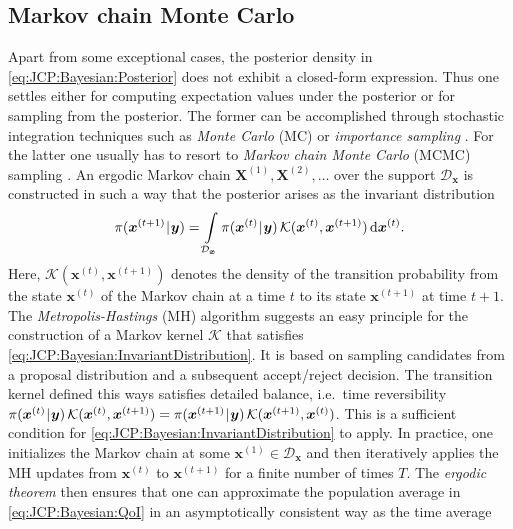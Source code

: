 \subsection{Markov chain Monte Carlo}
Apart from some exceptional cases, the posterior density in \cref{eq:JCP:Bayesian:Posterior} does not exhibit a closed-form expression.
Thus one settles either for computing expectation values under the posterior or for sampling from the posterior.
The former can be accomplished through stochastic integration techniques such as \emph{Monte Carlo} (MC) \cite{MCMC:Caflisch1998} or \emph{importance sampling} \cite{MCMC:Tokdar2010}.
For the latter one usually has to resort to \emph{Markov chain Monte Carlo} (MCMC) sampling \cite{MCMC:Gilks1996,MCMC:Brooks2011}.
An ergodic Markov chain \(\bm{X}^{(1)},\bm{X}^{(2)},\ldots\) over the support \(\mathcal{D}_{\bm{x}}\) is constructed in such a way that the posterior arises as the invariant distribution
\begin{equation} \label{eq:JCP:Bayesian:InvariantDistribution}
  \pi(\bm{x}^{(t+1)} {\:\!}|{\:\!} \bm{y}) = \int\limits_{\mathcal{D}_{\bm{x}}} \pi(\bm{x}^{(t)} {\:\!}|{\:\!} \bm{y}) \, \mathcal{K}(\bm{x}^{(t)},\bm{x}^{(t+1)}) \, \mathrm{d} \bm{x}^{(t)}.
\end{equation}
Here, \(\mathcal{K}(\bm{x}^{(t)},\bm{x}^{(t+1)})\) denotes the density of the transition probability from the state \(\bm{x}^{(t)}\)
of the Markov chain at a time \(t\) to its state \(\bm{x}^{(t+1)}\) at time \(t+1\).
The \emph{Metropolis-Hastings} (MH) algorithm \cite{MCMC:Metropolis1953,MCMC:Hastings1970} suggests an easy principle
for the construction of a Markov kernel \(\mathcal{K}\) that satisfies \cref{eq:JCP:Bayesian:InvariantDistribution}.
It is based on sampling candidates from a proposal distribution and a subsequent accept/reject decision.
The transition kernel defined this ways satisfies detailed balance,
i.e.\ time reversibility \(\pi(\bm{x}^{(t)} {\:\!}|{\:\!} \bm{y}) \, \mathcal{K}(\bm{x}^{(t)},\bm{x}^{(t+1)}) = \pi(\bm{x}^{(t+1)} {\:\!}|{\:\!} \bm{y}) \, \mathcal{K}(\bm{x}^{(t+1)},\bm{x}^{(t)})\).
This is a sufficient condition for \cref{eq:JCP:Bayesian:InvariantDistribution} to apply.
In practice, one initializes the Markov chain at some \(\bm{x}^{(1)} \in \mathcal{D}_{\bm{x}}\) and then
iteratively applies the MH updates from \(\bm{x}^{(t)}\) to \(\bm{x}^{(t+1)}\) for a finite number of times \(T\).
The \emph{ergodic theorem} then ensures that one can approximate the population average in \cref{eq:JCP:Bayesian:QoI} in an asymptotically consistent way as the time average
